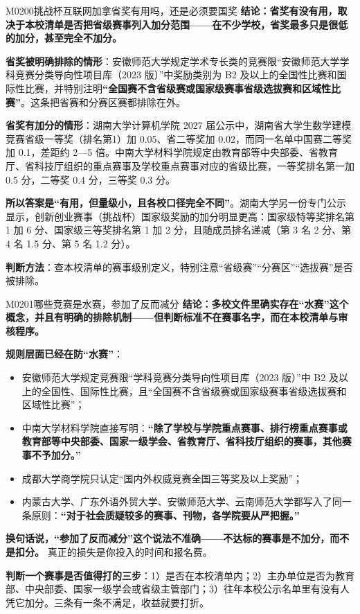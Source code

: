 \begin{qa}{M0200}{挑战杯互联网加拿省奖有用吗，还是必须要国奖}
\textbf{结论：省奖有没有用，取决于本校清单是否把省级赛事列入加分范围——在不少学校，省奖最多只是很低的加分，甚至完全不加分。}

\textbf{省奖被明确排除的情形}：安徽师范大学规定学术专长类的竞赛限“安徽师范大学学科竞赛分类导向性项目库（2023 版）”中奖励类别为 B2 及以上的全国性比赛和国际性比赛，并特别注明\textbf{“全国赛不含省级赛或国家级赛事省级选拔赛和区域性比赛”}。这条把省赛和分赛区赛都排除在外。

\textbf{省奖有加分的情形}：湖南大学计算机学院 2027 届公示中，湖南省大学生数学建模竞赛省级一等奖（排名第1）加 0.05、省二等奖加 0.02，而同一名单中国赛二等奖加 0.1，差距约 2—5 倍。中南大学材料学院规定由教育部等中央部委、省教育厅、省科技厅组织的重点赛事及学校重点赛事对应的省级比赛，一等奖排名第一加 0.5 分，二等奖 0.4 分，三等奖 0.3 分。

\textbf{所以答案是“有用，但量级小，且各校口径完全不同”}。湖南大学另一份专门公示显示，创新创业赛事（挑战杯）国家级奖励的加分明显更高：国家级特等奖排名第 1 加 6 分、国家级三等奖排名第 1 加 2 分，且随成员排名递减（第 3 名 2 分、第 4 名 1.5 分、第 5 名 1.2 分）。

\textbf{判断方法}：查本校清单的赛事级别定义，特别注意“省级赛”“分赛区”“选拔赛”是否被排除。
\end{qa}

\begin{qa}{M0201}{哪些竞赛是水赛，参加了反而减分}
\textbf{结论：多校文件里确实存在“水赛”这个概念，并且有明确的排除机制——但判断标准不在赛事名字，而在本校清单与审核程序。}

\textbf{规则层面已经在防“水赛”}：
\begin{itemize}
  \item 安徽师范大学规定竞赛限“学科竞赛分类导向性项目库（2023 版）”中 B2 及以上的全国性、国际性比赛，且“全国赛不含省级赛或国家级赛事省级选拔赛和区域性比赛”；
  \item 中南大学材料学院直接写明：\textbf{“除了学校与学院重点赛事、排行榜重点赛事或教育部等中央部委、国家一级学会、省教育厅、省科技厅组织的赛事，其他赛事不予加分。”}
  \item 成都大学商学院只认定“国内外权威竞赛全国三等奖及以上奖励”；
  \item 内蒙古大学、广东外语外贸大学、安徽师范大学、云南师范大学都写入了同一条原则：\textbf{“对于社会质疑较多的赛事、刊物，各学院要从严把握。”}
\end{itemize}

\textbf{换句话说，“参加了反而减分”这个说法不准确——不达标的赛事是不加分，而不是扣分。} 真正的损失是你投入的时间和报名费。

\textbf{判断一个赛事是否值得打的三步}：1）是否在本校清单内；2）主办单位是否为教育部、中央部委、国家一级学会或省级主管部门；3）往年本校公示名单里有没有人凭它加分。三条有一条不满足，收益就要打折。
\end{qa}

